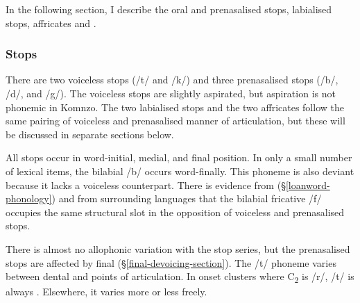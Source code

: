 In the following section, I describe the oral and prenasalised stops, labialised  stops, affricates and .

\subsubsection{Stops} \label{stopss}

There are two voiceless stops (/t/ and /k/) and three prenasalised stops (/b/, /d/, and /g/). The voiceless stops are slightly aspirated, but aspiration is not phonemic in Komnzo. The two labialised  stops and the two affricates follow the same pairing of voiceless and prenasalised manner of articulation, but these will be discussed in separate sections below.%

All stops occur in word-initial, medial, and final position. In only a small number of lexical items, the bilabial /b/ occurs word-finally. This phoneme is also deviant because it lacks a voiceless counterpart. There is evidence from   (\S{}\ref{loanword-phonology}) and from surrounding  languages that the bilabial fricative /f/ occupies the same structural slot in the opposition of voiceless and prenasalised stops.%

There is almost no allophonic variation with the stop series, but the prenasalised stops are affected by final  (\S{}\ref{final-devoicing-section}). The /t/ phoneme varies between dental and  points of articulation. In onset clusters where C\textsubscript{2} is /r/, /t/ is always . Elsewhere, it varies more or less freely.

